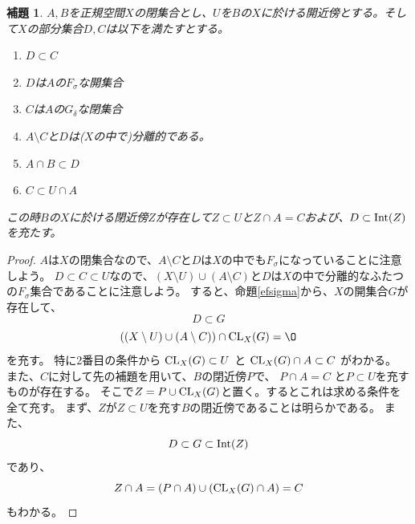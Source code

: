 \documentclass[leqno]{jsarticle}
\newtheorem{lem}[thm]{補題}
\newcommand{\cl}{\text{{\rm CL}} }
\newcommand{\nai}{\text{{\rm Int}} }
\begin{document}
\begin{lem}\label{daiji}
$A,B$を正規空間$X$の閉集合とし、$U$を$B$の$X$に於ける開近傍とする。そして$X$の部分集合$D, C$は以下を満たすとする。
\begin{enumerate}
\item $D\subset C$
\item $D$は$A$の$F_{\sigma}$な開集合
\item $C$は$A$の$G_{\delta}$な閉集合
\item $A\setminus C$と$D$は($X$の中で)分離的である。
\item $A\cap B\subset D$
\item $C\subset U\cap A$
\end{enumerate}
この時$B$の$X$に於ける閉近傍$Z$が存在して$Z\subset U$と$Z\cap A=C$および、$D\subset \nai (Z)$を充たす。
\end{lem}
\begin{proof}
$A$は$X$の閉集合なので、$A\setminus C$と$D$は$X$の中でも$F_{\sigma}$になっていることに注意しよう。
$D\subset C\subset U$なので、$(X\setminus U)\cup(A\setminus C)$と$D$は$X$の中で分離的なふたつの$F_{\sigma}$集合であることに注意しよう。
すると、命題\ref{efsigma}から、$X$の開集合$G$が存在して、
\[
D\subset G
\]
\[
((X\setminus U)\cup(A\setminus C))\cap \cl_X(G)=\O
\]
を充す。
特に2番目の条件から
$\cl_X(G)\subset U$
と
$\cl_X(G)\cap A\subset C$
がわかる。
また、$C$に対して先の補題を用いて、$B$の閉近傍$P$で、
$P\cap A=C$
と$P\subset U$を充すものが存在する。
そこで$Z=P\cup \cl_X(G)$と置く。するとこれは求める条件を全て充す。
まず、$Z$が$Z\subset U$を充す$B$の閉近傍であることは明らかである。
また、
\[
D\subset G\subset \nai (Z)
\]
であり、
\[
Z\cap A=(P\cap A)\cup (\cl_X(G)\cap A)=C
\]
もわかる。
\end{proof}
\end{document}
